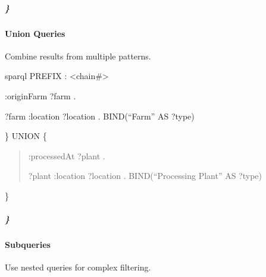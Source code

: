 \documentclass[letterpaper,10pt,english]{sphinxmanual}
\begin{document}
\subparagraph{\}}
\label{\detokenize{api/sparql-api:id44}}

\paragraph{Union Queries}
\label{\detokenize{api/sparql-api:union-queries}}
\sphinxAtStartPar
Combine results from multiple patterns.

\sphinxAtStartPar
{}
{\color{red}\bfseries{}\textasciigrave{}\textasciigrave{}}{\color{red}\bfseries{}\textasciigrave{}}sparql
PREFIX : \textless{}\sphinxhyphen{}chain\#\textgreater{}
\begin{description}
\begin{description}
\sphinxlineitem{\{}\begin{description}
\sphinxAtStartPar
:originFarm ?farm .

\end{description}

\sphinxAtStartPar
?farm :location ?location .
BIND(“Farm” AS ?type)

\end{description}

\sphinxAtStartPar
\}
UNION
\{
\begin{quote}
\begin{description}
\sphinxAtStartPar
:processedAt ?plant .

\end{description}

\sphinxAtStartPar
?plant :location ?location .
BIND(“Processing Plant” AS ?type)
\end{quote}

\sphinxAtStartPar
\}

\end{description}


\subparagraph{\}}
\label{\detokenize{api/sparql-api:id49}}

\paragraph{Subqueries}
\label{\detokenize{api/sparql-api:subqueries}}
\sphinxAtStartPar
Use nested queries for complex filtering.
\end{document}

